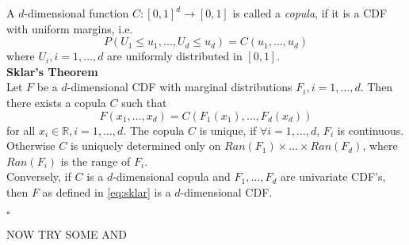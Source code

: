 
A $d$-dimensional function $C: [0,1]^d \rightarrow [0,1]$ is called a \textit{copula}, if it is a \ac{CDF} with uniform margins, i.e.
\begin{equation*}
P\left(U_{1} \leq u_{1}, \ldots, U_{d} \leq u_{d}\right)=C\left(u_{1}, \ldots, u_{d}\right)
\end{equation*}
where 
$ U_{i}, i = 1, \ldots, d $ 
are uniformly distributed in $[0,1]$.\\

\textbf{Sklar's Theorem} \\
Let $F$ be a $d$-dimensional \ac{CDF} with marginal distributions $F_{i}, i = 1, \ldots, d$.
Then there exists a copula $C$ such that
\begin{equation}
F(x_1, \ldots, x_d) = C (F_1(x_1), \ldots, F_d(x_d))
\label{eq:sklar}
\end{equation}
for all $x_i \in \mathbb{R}, i = 1, \ldots, d $. The copula $C$ is unique, if $ \forall i = 1, \ldots, d$, $F_i$ is continuous. Otherwise $C$ is uniquely determined only on
$Ran(F_1) \times \ldots \times Ran(F_d)$, where $Ran(F_{i})$ is the range of $F_i$.\\
Conversely, if $C$ is a $d$-dimensional copula and $F_1, \ldots, F_d$ are univariate \ac{CDF}'s, then $F$ as defined in \autoref{eq:sklar} is a 
$d$-dimensional \ac{CDF}.

\hfill $\square$


NOW TRY SOME \cite{vatter2018generalized} AND \cite{vatter2015generalized}

